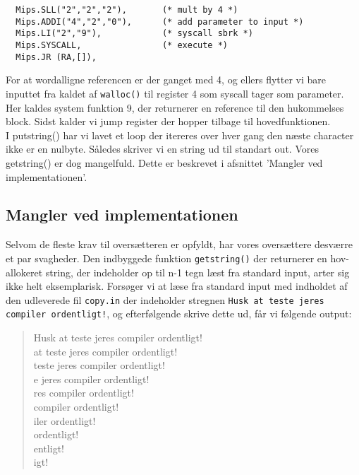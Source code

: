 \documentclass[12pt]{article}
\begin{document}
\begin{verbatim}
  Mips.SLL("2","2","2"),       (* mult by 4 *)   
  Mips.ADDI("4","2","0"),      (* add parameter to input *) 
  Mips.LI("2","9"),            (* syscall sbrk *)
  Mips.SYSCALL,                (* execute *)
  Mips.JR (RA,[]),
\end{verbatim}

For at wordalligne referencen er der ganget med 4, og ellers flytter vi bare inputtet fra kaldet af \texttt{walloc()} til register 4 som syscall tager som parameter. Her kaldes system funktion 9,
der returnerer en reference til den hukommelses block. Sidst kalder vi jump register der hopper tilbage til hovedfunktionen.\\

I putstring() har vi lavet et loop der itereres over hver gang den næste character ikke er en nulbyte. Således skriver vi en string ud til standart out. Vores getstring() er dog mangelfuld. Dette er beskrevet i afsnittet 'Mangler ved implementationen'.


\subsection{Mangler ved implementationen}

Selvom de fleste krav til oversætteren er opfyldt, har vores oversættere
desværre et par svagheder. Den indbyggede funktion \texttt{getstring()} der returnerer en hov-allokeret string, der indeholder op til n-1 tegn læst fra standard input, arter sig ikke helt eksemplarisk. Forsøger vi at læse fra standard input med indholdet af den udleverede fil \texttt{copy.in} der indeholder stregnen \texttt{Husk at teste jeres compiler ordentligt!}, og efterfølgende skrive dette ud, får vi følgende output:\\

\begin{quote}
Husk at teste jeres compiler ordentligt! \\
 at teste jeres compiler ordentligt! \\
teste jeres compiler ordentligt! \\
e jeres compiler ordentligt! \\
res compiler ordentligt! \\	
compiler ordentligt! \\
iler ordentligt! \\
 ordentligt! \\
entligt!\\
igt!
\end{quote}
\end{document}
